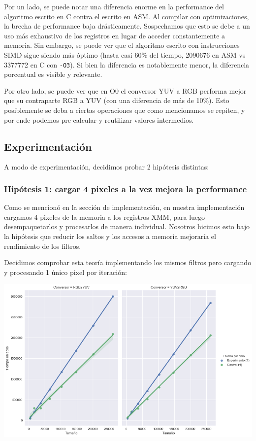 Por un lado, se puede notar una diferencia enorme en la performance del algoritmo escrito en C contra el escrito en ASM. Al compilar con optimizaciones, la brecha de performance baja drásticamente. Sospechamos que esto se debe a un uso más exhaustivo de los registros en lugar de acceder constantemente a memoria. Sin embargo, se puede ver que el algoritmo escrito con instrucciones SIMD sigue siendo más óptimo (hasta casi 60\% del tiempo, 2090676 en ASM vs 3377772 en C con \texttt{-O3}). Si bien la diferencia es notablemente menor, la diferencia porcentual es visible y relevante.

Por otro lado, se puede ver que en O0 el conversor YUV a RGB performa mejor que su contraparte RGB a YUV (con una diferencia de más de 10\%). Esto posiblemente se deba a ciertas operaciones que como mencionamos se repiten, y por ende podemos pre-calcular y reutilizar valores intermedios.

\subsection{Experimentación}

A modo de experimentación, decidimos probar 2 hipótesis distintas:

\subsubsection*{Hipótesis 1: cargar 4 pixeles a la vez mejora la performance}

Como se mencionó en la sección de implementación, en nuestra implementación cargamos 4 pixeles de la memoria a los registros XMM, para luego desempaquetarlos y procesarlos de manera individual. Nosotros hicimos esto bajo la hipótesis que reducir los saltos y los accesos a memoria mejoraría el rendimiento de los filtros.

Decidimos comprobar esta teoría implementando los mismos filtros pero cargando y procesando 1 único pixel por iteración:

\begin{center}
	\includegraphics[scale=0.5]{img/conversores_1pixel.png}
\end{center}

